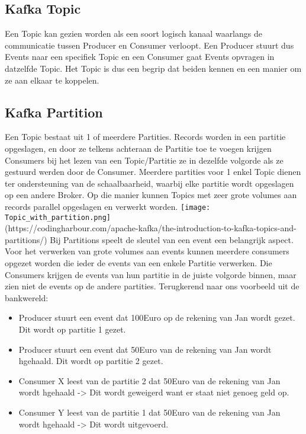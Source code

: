 \subsection{Kafka Topic}
Een Topic kan gezien worden als een soort logisch kanaal waarlangs de communicatie tussen Producer en Consumer verloopt. Een Producer stuurt dus Events naar een specifiek Topic en een Consumer gaat Events opvragen in datzelfde Topic. Het Topic is dus een begrip dat beiden kennen en een manier om ze aan elkaar te koppelen.
\autocite{Harbour2023}


\subsection{Kafka Partition}
Een Topic bestaat uit 1 of meerdere Partities. Records worden in een partitie opgeslagen, en door ze telkens achteraan de Partitie toe te voegen krijgen Consumers bij het lezen van een Topic/Partitie ze in dezelfde volgorde als ze gestuurd werden door de Consumer.
Meerdere partities voor 1 enkel Topic dienen ter ondersteuning van de schaalbaarheid, waarbij elke partitie wordt opgeslagen op een andere Broker. Op die manier kunnen Topics met zeer grote volumes aan records parallel opgeslagen en verwerkt worden.
\newline
\newline
\texttt{[image: Topic\_with\_partition.png]}
\\
(https://codingharbour.com/apache-kafka/the-introduction-to-kafka-topics-and-partitions/)
\newline
\newline
Bij Partitions speelt de sleutel van een event een belangrijk aspect. Voor het verwerken van grote volumes aan events kunnen meerdere consumers opgezet worden die ieder de events van een enkele Partitie verwerken. Die Consumers krijgen de events van hun partitie in de juiste volgorde binnen, maar zien niet de events op de andere partities. Terugkerend naar ons voorbeeld uit de bankwereld:
\begin{itemize}
    \item Producer stuurt een event dat 100Euro op de rekening van Jan wordt gezet. Dit wordt op partitie 1 gezet.
    \item Producer stuurt een event dat 50Euro van de rekening van Jan wordt hgehaald. Dit wordt op partitie 2 gezet.
    \item Consumer X leest van de partitie 2 dat 50Euro van de rekening van Jan wordt hgehaald -> Dit wordt geweigerd want er staat niet genoeg geld op.
    \item Consumer Y leest van de partitie 1 dat 50Euro van de rekening van Jan wordt hgehaald -> Dit wordt uitgevoerd.
\end{itemize}

